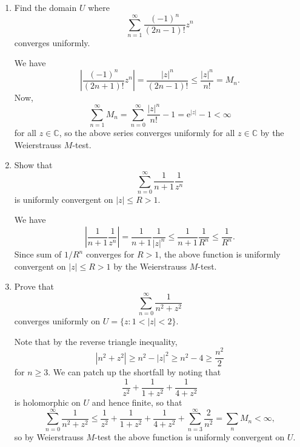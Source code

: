 \documentclass[letter-paper]{tufte-book}
\newenvironment{example}[1][Example]{\begin{trivlist}
\item[\hskip \labelsep {\bfseries #1}]}{\end{trivlist}}
\newcommand{\ex}{\mathrm{e}}
\begin{document}
\begin{example}
  \begin{enumerate}
    \item Find the domain $U$ where
    \begin{equation*}
      \sum_{n=1}^\infty \frac{(-1)^n}{(2n-1)!}z^n
    \end{equation*}
    converges uniformly.
    
    We have
    \begin{equation*}
      \left|\frac{(-1)^n}{(2n+1)!}z^n\right| = \frac{|z|^n}{(2n-1)!} \leq \frac{|z|^n}{n!} = M_n.
    \end{equation*}
    Now,
    \begin{equation*}
      \sum_{n=1}^\infty M_n = \sum_{n=0}^\infty \frac{|z|^n}{n!} - 1 = \ex^{|z|} - 1 < \infty
    \end{equation*}
    for all $z\in\mathbb{C}$, so the above series converges uniformly for all
    $z\in\mathbb{C}$ by the Weierstrauss $M$-test.
    
    \item Show that
    \begin{equation*}
      \sum_{n=0}^\infty \frac{1}{n+1}\frac{1}{z^n}
    \end{equation*}
    is uniformly convergent on $|z| \leq R > 1$.
    
    We have
    \begin{equation*}
      \left|\frac{1}{n+1}\frac{1}{z^n}\right| = \frac{1}{n+1}\frac{1}{|z|^n} \leq \frac{1}{n+1}\frac{1}{R^n} \leq \frac{1}{R^n}.
    \end{equation*}
    Since sum of $1/R^n$ converges for $R > 1$, the above function is uniformly
    convergent on $|z| \leq R > 1$ by the Weierstrauss $M$-test.
    
    \item Prove that
    \begin{equation*}
      \sum_{n=0}^\infty \frac{1}{n^2 + z^2}
    \end{equation*}
    converges uniformly on $U = \{z : 1 < |z| < 2\}$.
    
    Note that by the reverse triangle inequality,
    \begin{equation*}
      |n^2 + z^2| \geq n^2 - |z|^2 \geq n^2 - 4 \geq \frac{n^2}{2}
    \end{equation*}
    for $n\geq 3$. We can patch up the shortfall by noting that
    \begin{equation*}
      \frac{1}{z^2} + \frac{1}{1+z^2} + \frac{1}{4+z^2}
    \end{equation*}
    is holomorphic on $U$ and hence finite, so that
    \begin{equation*}
      \sum_{n=0}^\infty \frac{1}{n^2 + z^2} \leq \frac{1}{z^2} + \frac{1}{1+z^2} + \frac{1}{4+z^2} + \sum_{n=3}^\infty \frac{2}{n^2} = \sum_n M_n < \infty,
    \end{equation*}
    so by Weierstrauss $M$-test the above function is uniformly convergent on
    $U$.
  \end{enumerate}
\end{example}
\end{document}
